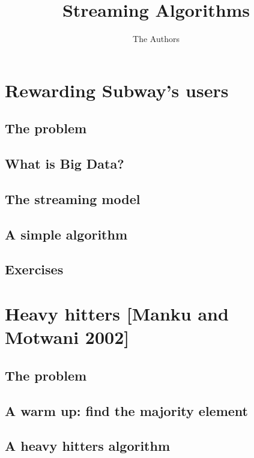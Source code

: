 \documentclass[11pt]{article}
\title{Streaming Algorithms}
\author{The Authors}
\begin{document}
\maketitle


\section{Rewarding Subway's users}

\subsection{The problem}

\subsection{What is Big Data?}

\subsection{The streaming model}

\subsection{A simple algorithm}

\subsection{Exercises}


\section{Heavy hitters {\small [Manku and Motwani 2002]}}


\subsection{The problem}

\subsection{A warm up: find the majority element}


\subsection{A heavy hitters algorithm}
\end{document}
